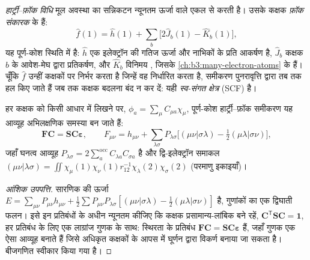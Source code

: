 \begin{definition}[हार्ट्री--फ़ॉक विधि, फ़ॉक संकारक, स्व-संगत क्षेत्र]\label{def:b3:computational-chemistry:hartree-fock}
\emph{हार्ट्री--फ़ॉक विधि} मूल अवस्था का सन्निकटन
न्यूनतम ऊर्जा वाले एकल  से करती है। उसके कक्षक
\emph{फ़ॉक संकारक} के  हैं:
\[
\hat f(1) = \hat h(1) + \sum_b\big[2\hat J_b(1) - \hat K_b(1)\big],
\]
यह पूर्ण-कोश स्थिति में है: $\hat h$ एक इलेक्ट्रॉन की गतिज ऊर्जा और नाभिकों के प्रति
आकर्षण है, $\hat J_b$ कक्षक $b$ के आवेश-मेघ द्वारा प्रतिकर्षण, और $\hat K_b$ विनिमय ,
जिसके  \cref{ch:b3:many-electron-atoms} के  हैं। चूँकि $\hat f$
उन्हीं कक्षकों पर निर्भर करता है जिन्हें वह निर्धारित करता है, समीकरण
पुनरावृत्ति द्वारा तब तक हल किए जाते हैं जब तक कक्षक बदलना बंद न कर दें: यही \emph{स्व-संगत
क्षेत्र} (SCF) है।
\end{definition}

\begin{theorem}[रूथान--हॉल समीकरण]\label{thm:b3:computational-chemistry:roothaan}
हर कक्षक को किसी आधार में लिखने पर, $\phi_a = \sum_\mu C_{\mu a}\chi_\mu$,
पूर्ण-कोश हार्ट्री--फ़ॉक समीकरण यह आव्यूह अभिलक्षणिक समस्या बन जाते हैं:
\[
\mathbf F\mathbf C = \mathbf S\mathbf C\boldsymbol\varepsilon, \qquad F_{\mu\nu} =
h_{\mu\nu} + \sum_{\lambda\sigma}P_{\lambda\sigma}\big[(\mu\nu|\sigma\lambda) -
\tfrac12(\mu\lambda|\sigma\nu)\big],
\]
जहाँ घनत्व आव्यूह $P_{\lambda\sigma} = 2\sum_a^{\mathrm{occ}}C_{\lambda a}C_{\sigma
a}$ है और द्वि-इलेक्ट्रॉन समाकल $(\mu\nu|\lambda\sigma) = \iint\chi_\mu(1)\chi_\nu(1)
r_{12}^{-1}\chi_\lambda(2)\chi_\sigma(2)$ (परमाणु इकाइयाँ)।
\end{theorem}

\begin{proof}[आंशिक उपपत्ति]
सारणिक की ऊर्जा $E = \sum_{\mu\nu}P_{\mu\nu}h_{\mu\nu} + \frac12
\sum P_{\mu\nu}P_{\lambda\sigma}[(\mu\nu|\sigma\lambda) - \frac12(\mu\lambda|\sigma\nu)]$ है,
गुणांकों का एक द्विघाती फलन। इसे इन प्रतिबंधों के अधीन न्यूनतम कीजिए
कि कक्षक प्रसामान्य-लांबिक बने रहें, $\mathbf C^{\mathsf T}\mathbf S\mathbf C = \mathbf 1$,
हर प्रतिबंध के लिए एक लाग्रांज गुणक के साथ: स्थिरता के
प्रतिबंध $\mathbf F\mathbf C = \mathbf S\mathbf C\boldsymbol\varepsilon$ हैं, जहाँ
गुणक एक ऐसा आव्यूह बनाते हैं जिसे अधिकृत कक्षकों के आपस में घूर्णन द्वारा
विकर्ण बनाया जा सकता है। बीजगणित स्वीकार किया गया है।
\end{proof}


